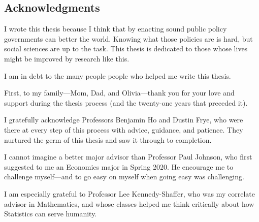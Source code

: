 \documentclass[11pt]{article}
\begin{document}
\singlespacing
\setcounter{page}{2}
\tableofcontents
\pagebreak
\listoffigures
\listoftables
\pagebreak

    

\doublespacing

\begin{center}\section*{Acknowledgments}\end{center}

I wrote this thesis because I think that by enacting sound public policy governments can better the world. Knowing what those policies are is hard, but social sciences are up to the task. This thesis is dedicated to those whose lives might be improved by research like this.

I am in debt to the many people people who helped me write this thesis.

First, to my family---Mom, Dad, and Olivia---thank you for your love and support during the thesis process (and the twenty-one years that preceded it).

I gratefully acknowledge Professors Benjamin Ho and Dustin Frye, who were there at every step of this process with advice, guidance, and patience. They nurtured the germ of this thesis and saw it through to completion.

I cannot imagine a better major advisor than Professor Paul Johnson, who first suggested to me an Economics major in Spring 2020. He encourage me to challenge myself---and to go easy on myself when going easy was challenging.

I am especially grateful to Professor Lee Kennedy-Shaffer, who was my correlate advisor in Mathematics, and whose classes helped me think critically about how Statistics can serve humanity.


\pagebreak

\doublespacing
\end{document}
